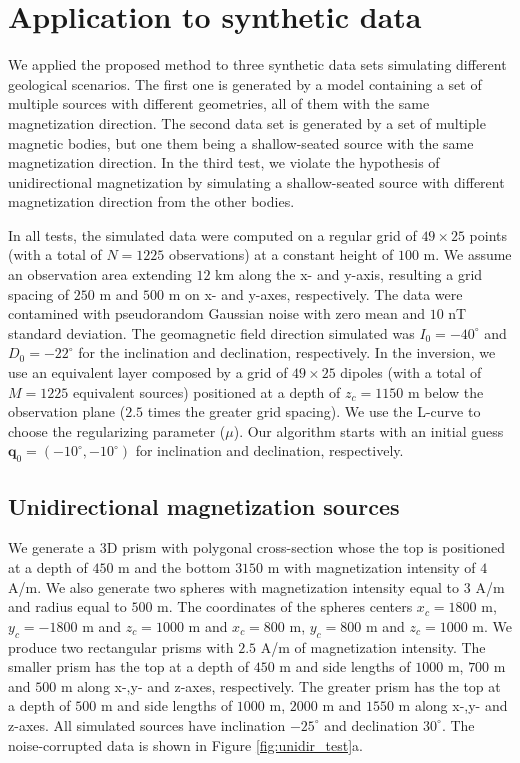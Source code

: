 \section{Application to synthetic data}
\label{sec:synt_tests}

We applied the proposed method to three synthetic data sets simulating different geological scenarios. The first one is generated by a model containing a set of multiple sources with different geometries, all of them with the same magnetization direction. The second data set is generated by a set of multiple magnetic bodies, but one them being a shallow-seated source with the same magnetization direction. In the third test, we violate the hypothesis of unidirectional magnetization by simulating a shallow-seated source with different magnetization direction from the other bodies.

In all tests, the simulated data were computed on a regular grid of $49 \times 25$ points (with a total of $N = 1225$ observations) at a constant height of $100$ m.  We assume an observation area extending $12$ km along the x- and y-axis, resulting a grid spacing of $250$ m and $500$ m on x- and y-axes, respectively. The data were contamined with pseudorandom Gaussian noise with zero mean and $10$ nT standard deviation. The geomagnetic field direction simulated was $I_0 = -40^\circ$ and $D_0 = -22^\circ$ for the inclination and declination, respectively. In the inversion, we use an equivalent layer composed by a grid of $49 \times 25$ dipoles (with a total of $M = 1225$ equivalent sources) positioned at a depth of $z_c = 1150$ m below the observation plane ($2.5$ times the greater grid spacing). We use the L-curve to choose the regularizing parameter ($\mu$). Our algorithm starts with an initial guess $\mathbf{q}_0 = (-10^\circ,-10^\circ)$ for inclination and declination, respectively.

\subsection{Unidirectional magnetization sources}
 
We generate a 3D prism with polygonal cross-section whose the top is positioned at a depth of $450$ m and the bottom $3150$ m with magnetization intensity of $4$ A/m. We also generate two spheres with magnetization intensity equal to $3$ A/m and radius equal to $500$ m. The coordinates of the spheres centers $x_c = 1800$ m, $y_c = -1800$ m and $z_c = 1000$ m and $x_c = 800$ m, $y_c = 800$ m and $z_c= 1000$ m. We produce two rectangular prisms with $2.5$ A/m of magnetization intensity. The smaller prism has the top at a depth of $450$ m and side lengths of $1000$ m, $700$ m and $500$ m along x-,y- and z-axes, respectively. The greater prism has the top at a depth of $500$ m and side lengths of $1000$ m, $2000$ m and $1550$ m along x-,y- and z-axes. All simulated sources have inclination $-25^\circ$ and declination $30^\circ$. The noise-corrupted data is shown in Figure \ref{fig:unidir_test}a. 

